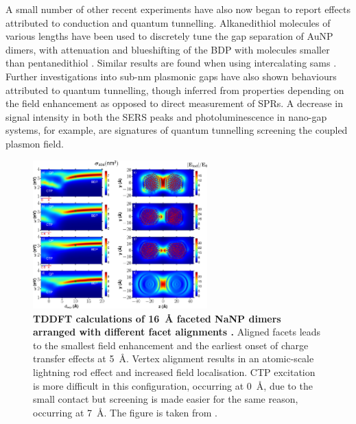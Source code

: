 \documentclass{article}
\begin{document}
A small number of other recent experiments have also now began to report effects attributed to conduction and quantum tunnelling. Alkanedithiol molecules of various lengths have been used to discretely tune the gap separation of AuNP dimers, with attenuation and blueshifting of the BDP with molecules smaller than pentanedithiol \cite{cha2014}. Similar results are found when using intercalating \glspl{sam} \cite{tan2014}.
Further investigations into sub-nm plasmonic gaps have also shown behaviours attributed to quantum tunnelling, though inferred from properties depending on the field enhancement as opposed to direct measurement of SPRs. A decrease in signal intensity in both the SERS peaks \cite{zhu2014} and photoluminescence \cite{kravtsov2014} in nano-gap systems, for example, are signatures of quantum tunnelling screening the coupled plasmon field.

\begin{figure}[bt]
\centering
\includegraphics[width=0.6\textwidth]{figures/literature/nl-2015-007593_0001}
\caption[TDDFT calculations of \SI{16}{\angstrom} faceted NaNP dimers arranged with different facet alignments \cite{barbry2015}]{\textbf{TDDFT calculations of \SI{16}{\angstrom} faceted NaNP dimers arranged with different facet alignments \cite{barbry2015}.} Aligned facets leads to the smallest field enhancement and the earliest onset of charge transfer effects at \SI{5}{\angstrom}. Vertex alignment results in an atomic-scale lightning rod effect and increased field localisation. CTP excitation is more difficult in this configuration, occurring at \SI{0}{\angstrom}, due to the small contact but screening is made easier for the same reason, occurring at \SI{7}{\angstrom}. The figure is taken from \cite{barbry2015}.}
\label{fig:atomic_morphology}
\end{figure}
\end{document}

